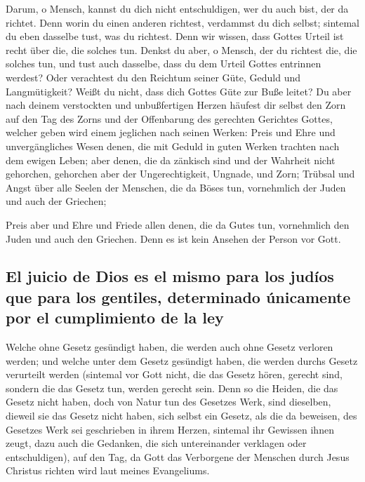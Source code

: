  Darum, o Mensch, kannst du dich nicht entschuldigen, wer
du auch bist, der da richtet. Denn worin du einen anderen richtest,
verdammst du dich selbst; sintemal du eben dasselbe tust, was du
richtest.  Denn wir wissen, dass Gottes Urteil ist recht
über die, die solches tun.  Denkst du aber, o Mensch, der
du richtest die, die solches tun, und tust auch dasselbe, dass du dem
Urteil Gottes entrinnen werdest?  Oder verachtest du den
Reichtum seiner Güte, Geduld und Langmütigkeit? Weißt du nicht, dass
dich Gottes Güte zur Buße leitet?  Du aber nach deinem
verstockten und unbußfertigen Herzen häufest dir selbst den Zorn auf den
Tag des Zorns und der Offenbarung des gerechten Gerichtes Gottes,
 welcher geben wird einem jeglichen nach seinen Werken:
 Preis und Ehre und unvergängliches Wesen denen, die mit
Geduld in guten Werken trachten nach dem ewigen Leben; 
aber denen, die da zänkisch sind und der Wahrheit nicht gehorchen,
gehorchen aber der Ungerechtigkeit, Ungnade, und Zorn; 
Trübsal und Angst über alle Seelen der Menschen, die da Böses tun,
vornehmlich der Juden und auch der Griechen;

 Preis aber und Ehre und Friede allen denen, die da Gutes
tun, vornehmlich den Juden und auch den Griechen.  Denn
es ist kein Ansehen der Person vor Gott.

\hypertarget{el-juicio-de-dios-es-el-mismo-para-los-juduxedos-que-para-los-gentiles-determinado-uxfanicamente-por-el-cumplimiento-de-la-ley}{%
\subsection{El juicio de Dios es el mismo para los judíos que para los
gentiles, determinado únicamente por el cumplimiento de la
ley}\label{el-juicio-de-dios-es-el-mismo-para-los-juduxedos-que-para-los-gentiles-determinado-uxfanicamente-por-el-cumplimiento-de-la-ley}}

 Welche ohne Gesetz gesündigt haben, die werden auch ohne
Gesetz verloren werden; und welche unter dem Gesetz gesündigt haben, die
werden durchs Gesetz verurteilt werden  (sintemal vor
Gott nicht, die das Gesetz hören, gerecht sind, sondern die das Gesetz
tun, werden gerecht sein.  Denn so die Heiden, die das
Gesetz nicht haben, doch von Natur tun des Gesetzes Werk, sind
dieselben, dieweil sie das Gesetz nicht haben, sich selbst ein Gesetz,
 als die da beweisen, des Gesetzes Werk sei geschrieben
in ihrem Herzen, sintemal ihr Gewissen ihnen zeugt, dazu auch die
Gedanken, die sich untereinander verklagen oder entschuldigen),
 auf den Tag, da Gott das Verborgene der Menschen durch
Jesus Christus richten wird laut meines Evangeliums.

